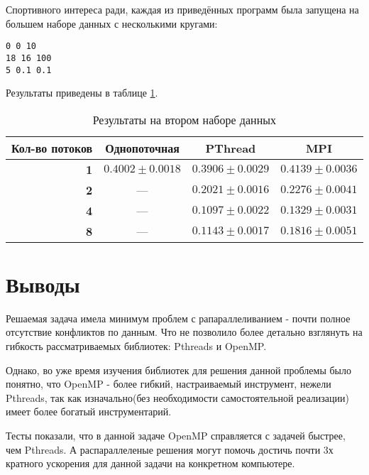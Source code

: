  
Спортивного интереса ради, каждая из приведённых программ была запущена на большем наборе данных с несколькими кругами:
\begin{lstlisting}[caption={Набор данных 2}, label={lst:input1}]
0 0 10
18 16 100
5 0.1 0.1
\end{lstlisting}

Результаты приведены в таблице \ref{tab:input2}.
\begin{table}[h!]
	\caption{Результаты на втором наборе данных}
	
	\center
	\begin{tabular}{|r|c|c|c|}
		\hline 
		\textbf{Кол-во потоков} & \textbf{Однопоточная} & \textbf{PThread} & \textbf{MPI} \\ 
		\hline 
		\textbf{1} & $0.4002 \pm 0.0018$ & $0.3906 \pm 0.0029$ & $0.4139 \pm 0.0036$ \\ 
		\hline 
		\textbf{2} & ---                 & $0.2021 \pm 0.0016$ & $0.2276 \pm 0.0041$ \\ 
		\hline 
		\textbf{4} & ---                 & \boldmath$0.1097 \pm 0.0022$ & $0.1329 \pm 0.0031$ \\ 
		\hline 
		\textbf{8} & ---                 & $0.1143 \pm 0.0017$ & $0.1816 \pm 0.0051$ \\ 
		\hline 
	\end{tabular}
	
	\label{tab:input2}
\end{table}

\section{Выводы}
Решаемая задача имела минимум проблем с рапараллеливанием - почти полное отсутствие конфликтов по данным. Что не позволило более детально взглянуть на гибкость рассматриваемых библиотек: Pthreads и OpenMP.

Однако, во уже время изучения библиотек для решения данной проблемы было понятно, что OpenMP - более гибкий, настраиваемый инструмент, нежели Pthreads, так как изначально(без необходимости самостоятельной реализации) имеет более богатый инструментарий.

Тесты показали, что в данной задаче OpenMP справляется с задачей быстрее, чем Pthreads. А распараллеленые решения могут помочь достичь почти 3х кратного ускорения для данной задачи на конкретном компьютере.


